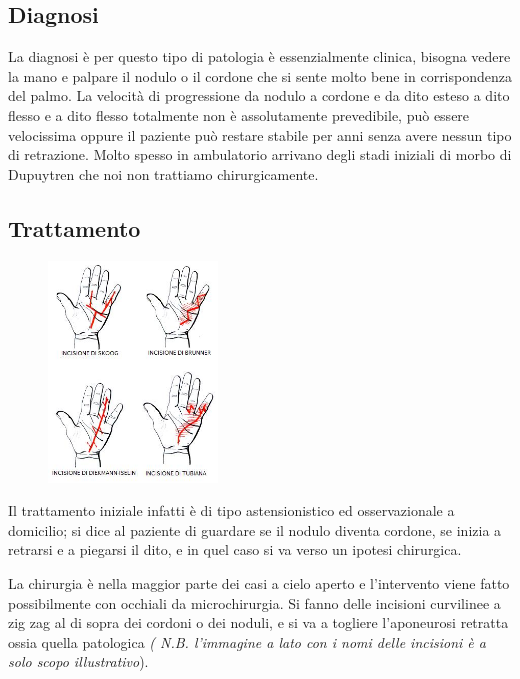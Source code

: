 \subsection{Diagnosi}

La diagnosi è per questo tipo di patologia è essenzialmente clinica, bisogna vedere la mano e palpare il nodulo o il cordone che si sente molto bene in corrispondenza del palmo. La velocità di progressione da nodulo a cordone e da dito esteso a dito flesso e a dito flesso totalmente non è assolutamente prevedibile, può essere velocissima
oppure il paziente può restare stabile per anni senza avere nessun tipo di retrazione. Molto spesso in ambulatorio arrivano degli stadi iniziali di morbo di Dupuytren che noi non trattiamo chirurgicamente.

\subsection{Trattamento}

\begin{figure}[!ht]
\centering
\includegraphics[width=0.4\textwidth]{005/image3.jpeg}
\end{figure}

Il trattamento iniziale infatti è di tipo astensionistico ed osservazionale a domicilio; si dice al paziente di guardare se il nodulo diventa
cordone, se inizia a retrarsi e a piegarsi il dito, e in quel caso si va verso un ipotesi chirurgica.

La chirurgia è nella maggior parte dei casi a cielo aperto e l'intervento viene fatto possibilmente con occhiali da microchirurgia.
Si fanno delle incisioni curvilinee a zig zag al di sopra dei cordoni o dei noduli, e si va a togliere l'aponeurosi retratta ossia quella patologica \emph{( N.B. l'immagine a lato con i nomi delle incisioni è a solo scopo illustrativo}).

